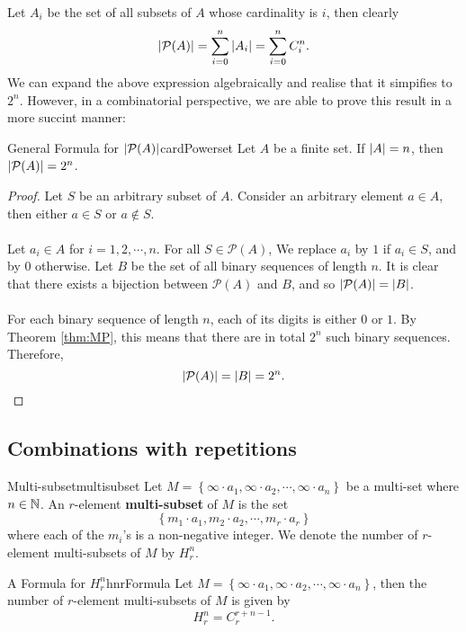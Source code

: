 \documentclass[math]{amznotes}
\theoremstyle{remark}
\begin{document}
Let $A_i$ be the set of all subsets of $A$ whose cardinality is $i$, then clearly
\begin{equation*}
    {\left\lvert {\mathcal{P}(A)} \right\rvert} = \sum_{i = 0}^{n}{\left\lvert {A_i} \right\rvert} = \sum_{i = 0}^{n}C^n_i.
\end{equation*}
We can expand the above expression algebraically and realise that it simpifies to $2^n$. However, in a combinatorial perspective, we are able to prove this result in a more succint manner:
\begin{thmbox}{General Formula for ${\left\lvert {\mathcal{P}(A)} \right\rvert}$}{cardPowerset}
    Let $A$ be a finite set. If ${\left\lvert {A} \right\rvert} = n$, then ${\left\lvert {\mathcal{P}(A)} \right\rvert} = 2^n$.
    \tcblower
    \begin{proof}
        Let $S$ be an arbitrary subset of $A$. Consider an arbitrary element $a \in A$, then either $a \in S$ or $a \notin S$. 
        \\\\
        Let $a_i \in A$ for $i = 1, 2, \cdots, n$. For all $S \in \mathcal{P}(A)$, We replace $a_i$ by $1$ if $a_i \in S$, and by $0$ otherwise. Let $B$ be the set of all binary sequences of length $n$. It is clear that there exists a bijection between $\mathcal{P}(A)$ and $B$, and so ${\left\lvert {\mathcal{P}(A)} \right\rvert} = {\left\lvert {B} \right\rvert}$.
        \\\\
        For each binary sequence of length $n$, each of its digits is either $0$ or $1$. By Theorem \ref{thm:MP}, this means that there are in total $2^n$ such binary sequences. Therefore,
        \begin{equation*}
            {\left\lvert {\mathcal{P}(A)} \right\rvert} = {\left\lvert {B} \right\rvert} = 2^n.
        \end{equation*}
    \end{proof}
\end{thmbox}

\subsection{Combinations with repetitions}
\begin{dfnbox}{Multi-subset}{multisubset}
    Let $M = \left\{\infty \cdot a_1, \infty \cdot a_2, \cdots, \infty \cdot a_n\right\}$ be a multi-set where $n \in \mathbb{N}$. An $r$-element {\color{red} \textbf{multi-subset}} of $M$ is the set
    \begin{displaymath}
        \left\{m_1 \cdot a_1, m_2 \cdot a_2, \cdots, m_r \cdot a_r\right\}
    \end{displaymath}
    where each of the $m_i$'s is a non-negative integer. We denote the number of $r$-element multi-subsets of $M$ by $H^n_r$.
\end{dfnbox}
\begin{probox}{A Formula for $H^n_r$}{hnrFormula}
    Let $M = \left\{\infty \cdot a_1, \infty \cdot a_2, \cdots, \infty \cdot a_n\right\}$, then the number of $r$-element multi-subsets of $M$ is given by
    \begin{equation*}
        H^n_r = C^{r + n - 1}_r.
    \end{equation*}
\end{probox}
\end{document}
